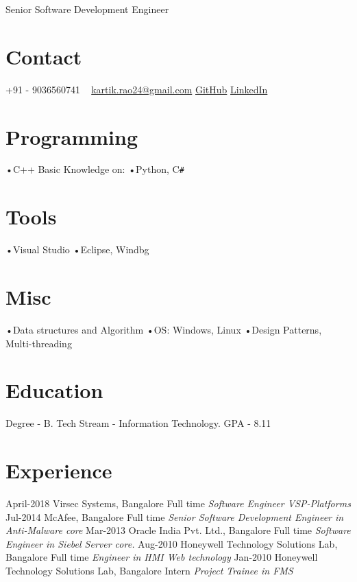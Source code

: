 \documentclass[]{kartikkumar-cv}
\begin{document}
       {Senior Software Development Engineer}
          
\begin{aside}
  \section{Contact}
    +91 - 9036560741
    ~
    \href{mailto:kartik.rao24@gmail.com}{kartik.rao24@gmail.com}
    \href{https://github.com/raokartikkumar24}{GitHub}
    \href{https://in.linkedin.com/in/raokartikkumar}{LinkedIn}
    ~
  \section{Programming}
   •C++ 
   Basic Knowledge on:
   •Python, C\texttt{\#}
    ~
    \section{Tools}
    •Visual Studio
    •Eclipse, Windbg
    \section{Misc}
   •Data structures and Algorithm
   •OS: Windows, Linux
   •Design Patterns, Multi-threading
~   
  \section{Education}
  	{Degree - B. Tech }
  	{Stream - Information Technology.}
  	{ GPA - 8.11}
~  	
\end{aside}

\section{Experience}

\begin{entrylist}
	\entry
	{April-2018}
	{Virsec Systems, Bangalore}
	{Full time}
	{\emph{Software Engineer VSP-Platforms}}
  \entry
    {Jul-2014}
    {McAfee, Bangalore}
    {Full time}
    {\emph{Senior Software Development Engineer in Anti-Malware core}}
  \entry
    {Mar-2013}
    {Oracle India Pvt. Ltd., Bangalore}
    {Full time}
    {\emph{Software Engineer in Siebel Server core.}}
  \entry
    {Aug-2010}
    {Honeywell Technology Solutions Lab, Bangalore}
    {Full time}
    {\emph{Engineer in HMI Web technology}}
   \entry
   {Jan-2010}
   {Honeywell Technology Solutions Lab, Bangalore}
   {Intern}
   {\emph{Project Trainee in FMS} }
\end{entrylist}
\end{document}
